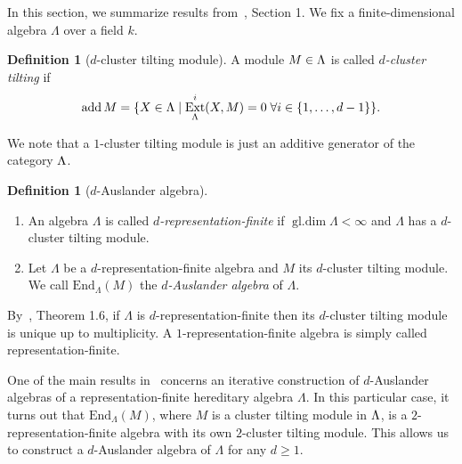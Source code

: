 \documentclass[a4paper,oneside,svgnames,draft]{amsart}
\theoremstyle{plain}
\theoremstyle{definition}
\newtheorem{definition}[theorem]{Definition}
\let\mod\relax
\DeclareMathOperator{\ext}{Ext}
\DeclareMathOperator{\add}{add}
\DeclareMathOperator{\mod}{mod}
\DeclareMathOperator{\gldim}{gl.dim}
\begin{document}
 In this section, we summarize results from~\cite{iyama}, Section 1. We fix a
 finite-dimensional algebra $\Lambda$ over a field $k$.

 \begin{definition}[$d$-cluster tilting module]
  A module $M \in \mod \Lambda$ is called \emph{$d$-cluster tilting} if
  \[
   \add M = \{X \in \mod \Lambda \mid \ext^{i}_{\Lambda}(X,M) = 0 \; \forall i
   \in \{1,\ldots,d-1\}\}.
  \]
 \end{definition}
 We note that a $1$-cluster tilting module is just an additive generator of the
 category $\mod \Lambda$.
 \begin{definition}[$d$-Auslander algebra]
  \leavevmode
  \begin{enumerate}
   \item An algebra $\Lambda$ is called \emph{$d$-representation-finite} if
    $\gldim\Lambda<\infty$ and $\Lambda$ has a $d$-cluster tilting module.
   \item Let $\Lambda$ be a $d$-representation-finite algebra and $M$ its
    $d$-cluster tilting module. We call $\mathrm{End}_{\Lambda}(M)$ the
    \emph{$d$-Auslander algebra} of $\Lambda$.
  \end{enumerate}
 \end{definition}

 By~\cite{iyama}, Theorem 1.6, if $\Lambda$ is $d$-representation-finite then
 its $d$-cluster tilting module is unique up to multiplicity. A
 $1$-representation-finite algebra is simply called representation-finite.

 One of the main results in~\cite{iyama} concerns an iterative construction of
 $d$-Auslander algebras of a representation-finite hereditary algebra $\Lambda$.
 In this particular case, it turns out that $\mathrm{End}_{\Lambda}(M)$, where
 $M$ is a cluster tilting module in $\mod\Lambda$, is a
 $2$-representation-finite algebra with its own $2$-cluster tilting module. This
 allows us to construct a $d$-Auslander algebra of $\Lambda$ for any $d \geq 1$.
\end{document}
